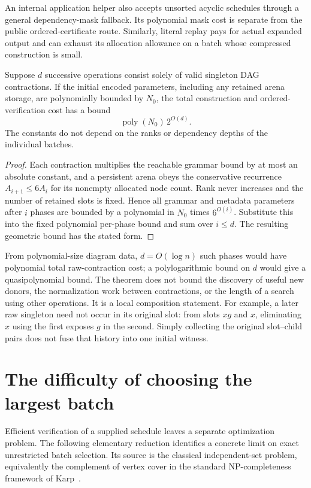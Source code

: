 An internal application helper also accepts unsorted acyclic schedules
through a general dependency-mask fallback. Its polynomial mask cost
is separate from the public ordered-certificate route. Similarly,
literal replay pays for actual expanded output and can exhaust its
allocation allowance on a batch whose compressed construction is small.

\begin{theorem}
\label{alg:phases}
Suppose $d$ successive operations consist solely of valid singleton DAG
contractions. If the initial encoded parameters, including any retained
arena storage, are polynomially bounded by $N_0$, the total construction
and ordered-verification cost
has a bound
\[
 \operatorname{poly}(N_0)\,2^{O(d)}.
\]
The constants do not depend on the ranks or dependency depths of
the individual batches.
\end{theorem}

\begin{proof}
Each contraction multiplies the reachable grammar bound by at most an
absolute constant, and a persistent arena obeys the conservative
recurrence $A_{i+1}\le6A_i$ for its nonempty allocated node count. Rank never
increases and the number of retained slots is fixed. Hence all grammar
and metadata parameters after $i$ phases are bounded by a polynomial
in $N_0$ times $6^{O(i)}$. Substitute this into the fixed polynomial
per-phase bound and sum over $i\le d$. The resulting geometric bound
has the stated form.
\end{proof}

From polynomial-size diagram data, $d=O(\log n)$ such phases would
have polynomial total raw-contraction cost; a polylogarithmic bound
on $d$ would give a quasipolynomial bound. The theorem does not bound
the discovery of useful new donors, the normalization work between
contractions, or the length of a search using other operations.
It is a local composition statement. For example, a later raw
singleton need not occur in its original slot: from slots $xg$ and
$x$, eliminating $x$ using the first exposes $g$ in the second.
Simply collecting the original slot--child pairs does not fuse that
history into one initial witness.

\section{The difficulty of choosing the largest batch}
\label{alg:selection}

Efficient verification of a supplied schedule leaves a separate
optimization problem. The following elementary reduction identifies
a concrete limit on exact unrestricted batch selection. Its source
is the classical independent-set problem, equivalently the complement
of vertex cover in the standard NP-completeness framework
of Karp~\cite{Karp1972}.

